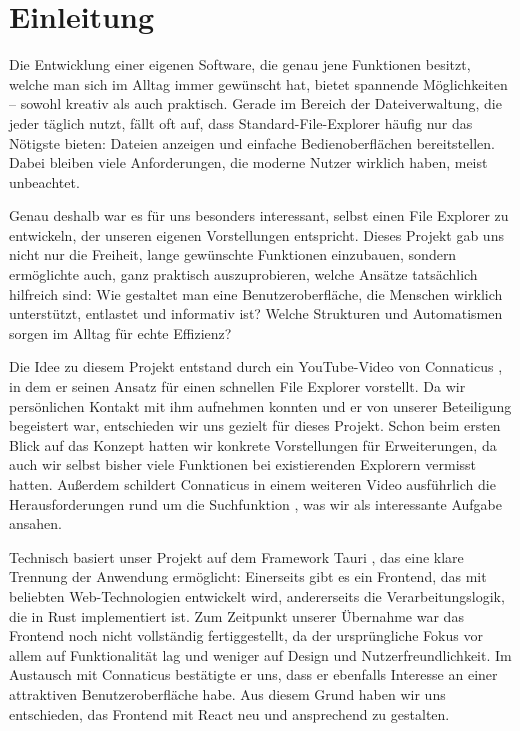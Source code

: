 \section{Einleitung}

Die Entwicklung einer eigenen Software, die genau jene Funktionen besitzt, welche man sich im Alltag
immer gewünscht hat, bietet spannende Möglichkeiten – sowohl kreativ als auch praktisch. Gerade im
Bereich der Dateiverwaltung, die jeder täglich nutzt, fällt oft auf, dass Standard-File-Explorer
häufig nur das Nötigste bieten: Dateien anzeigen und einfache Bedienoberflächen bereitstellen. Dabei
bleiben viele Anforderungen, die moderne Nutzer wirklich haben, meist unbeachtet.

Genau deshalb war es für uns besonders interessant, selbst einen File Explorer zu entwickeln, der
unseren eigenen Vorstellungen entspricht. Dieses Projekt gab uns nicht nur die Freiheit, lange
gewünschte Funktionen einzubauen, sondern ermöglichte auch, ganz praktisch auszuprobieren, welche
Ansätze tatsächlich hilfreich sind: Wie gestaltet man eine Benutzeroberfläche, die Menschen wirklich
unterstützt, entlastet und informativ ist? Welche Strukturen und Automatismen sorgen im Alltag für
echte Effizienz?

Die Idee zu diesem Projekt entstand durch ein YouTube-Video von Connaticus \cite{connaticus01}, in
dem er seinen Ansatz für einen schnellen File Explorer vorstellt. Da wir persönlichen Kontakt mit
ihm aufnehmen konnten und er von unserer Beteiligung begeistert war, entschieden wir uns gezielt für
dieses Projekt. Schon beim ersten Blick auf das Konzept hatten wir konkrete Vorstellungen für
Erweiterungen, da auch wir selbst bisher viele Funktionen bei existierenden Explorern vermisst
hatten. Außerdem schildert Connaticus in einem weiteren Video ausführlich die Herausforderungen rund
um die Suchfunktion \cite{connaticus02}, was wir als interessante Aufgabe ansahen.

Technisch basiert unser Projekt auf dem Framework Tauri \cite{tauri2025}, das eine klare Trennung
der Anwendung ermöglicht: Einerseits gibt es ein Frontend, das mit beliebten Web-Technologien
entwickelt wird, andererseits die Verarbeitungslogik, die in Rust implementiert ist. Zum Zeitpunkt
unserer Übernahme war das Frontend noch nicht vollständig fertiggestellt, da der ursprüngliche Fokus
vor allem auf Funktionalität lag und weniger auf Design und Nutzerfreundlichkeit. Im Austausch mit
Connaticus bestätigte er uns, dass er ebenfalls Interesse an einer attraktiven Benutzeroberfläche
habe. Aus diesem Grund haben wir uns entschieden, das Frontend mit React neu und ansprechend zu
gestalten.
